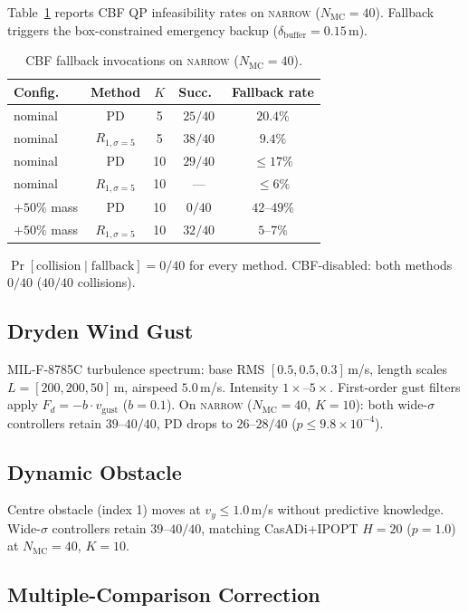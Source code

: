 \documentclass[11pt,a4paper]{article}
\newcommand{\Nm}{N_{\mathrm{MC}}}
\begin{document}
Table~\ref{tab:s5-fallback} reports CBF QP infeasibility rates on
\textsc{narrow} ($\Nm = 40$). Fallback triggers the box-constrained
emergency backup ($\delta_{\mathrm{buffer}} = 0.15$\,m).

\begin{table}[h]
\centering
\caption{CBF fallback invocations on \textsc{narrow} ($\Nm = 40$).}\label{tab:s5-fallback}
\begin{tabular}{lcccc}
\toprule
Config.\ & Method & $K$ & Succ.\ & Fallback rate \\
\midrule
nominal & PD & 5 & $25/40$ & $20.4\%$ \\
nominal & $R_{1,\sigma=5}$ & 5 & $38/40$ & $9.4\%$ \\
nominal & PD & 10 & $29/40$ & $\le 17\%$ \\
nominal & $R_{1,\sigma=5}$ & 10 & --- & $\le 6\%$ \\
$+50\%$ mass & PD & 10 & $0/40$ & $42$--$49\%$ \\
$+50\%$ mass & $R_{1,\sigma=5}$ & 10 & $32/40$ & $5$--$7\%$ \\
\bottomrule
\end{tabular}
\par\smallskip
$\Pr[\text{collision}\mid\text{fallback}] = 0/40$ for every method.
CBF-disabled: both methods $0/40$ ($40/40$ collisions).
\end{table}

\subsection{Dryden Wind Gust}

MIL-F-8785C turbulence spectrum: base RMS $[0.5, 0.5, 0.3]$\,m/s,
length scales $L = [200, 200, 50]$\,m, airspeed $5.0$\,m/s. Intensity
$1\times$--$5\times$. First-order gust filters apply
$F_d = -b \cdot v_{\mathrm{gust}}$ ($b = 0.1$). On \textsc{narrow}
($\Nm = 40$, $K = 10$): both wide-$\sigma$ controllers retain
$39$--$40/40$, PD drops to $26$--$28/40$
($p \le 9.8 \times 10^{-4}$).

\subsection{Dynamic Obstacle}

Centre obstacle (index 1) moves at $v_y \le 1.0$\,m/s without
predictive knowledge. Wide-$\sigma$ controllers retain
$39$--$40/40$, matching CasADi+IPOPT $H = 20$ ($p = 1.0$)
at $\Nm = 40$, $K = 10$.

\subsection{Multiple-Comparison Correction}
\end{document}
